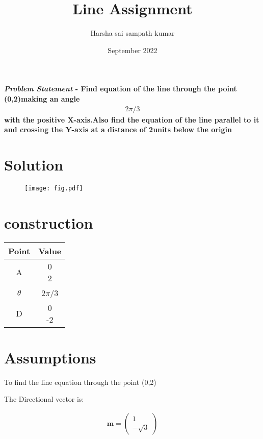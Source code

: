 \documentclass[journal,10pt,twocolumn]{article}
\title{\textbf{Line Assignment}}
\author{Harsha sai sampath kumar}
\date{September 2022}
\let\vec\mathbf
\newcommand{\myvec}[1]{\ensuremath{\begin{pmatrix}#1\end{pmatrix}}}
\begin{document}
\maketitle
\paragraph{\textit{\large Problem Statement} - Find equation of the line through the point (0,2)making an angle \begin{align}2\pi/3\end{align} with the positive X-axis.Also find the equation of the line parallel to it and crossing the Y-axis at a distance of 2units below the origin}

\section*{\large Solution}

\begin{figure}[H]
\centering
\texttt{[image: fig.pdf]}
\caption{}
\end{figure}


\section{construction}

\begin{tabular}{|c|c|}
	\hline
	\textbf{Point}&\textbf{Value}\\
	\hline
	A&\myvec{0\\2}\\
	\hline
	$\theta$&2$\pi$/3\\
	\hline
	D&\myvec{0\\-2}\\
	\hline
	
	
\end{tabular}


\section*{Assumptions}
To find the line equation  through the point (0,2)
\vspace*{3mm}

 The Directional vector is:

\begin{eqnarray}
	\vec{m}=\myvec{1\\-\sqrt{3}}
\end{eqnarray}
  
\end{document}
